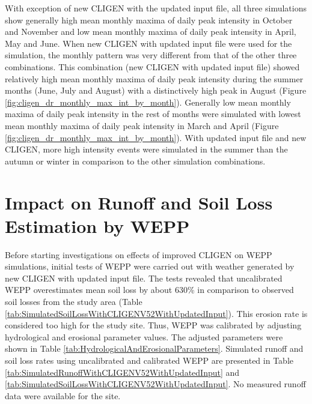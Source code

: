 With exception of new CLIGEN with the updated input file, all three simulations
show generally high mean monthly maxima of daily peak intensity in October and
November and low mean monthly maxima of daily peak intensity in April, May and
June. When new CLIGEN with updated input file were used for the simulation, the
monthly pattern was very different from that of the other three combinations.
This combination (new CLIGEN with updated input file) showed relatively high
mean monthly maxima of daily peak intensity during the summer months (June, July
and August) with a distinctively high peak in August (Figure
\ref{fig:cligen_dr_monthly_max_int_by_month}). Generally low mean monthly maxima
of daily peak intensity in the rest of months were simulated with lowest mean
monthly maxima of daily peak intensity in March and April (Figure
\ref{fig:cligen_dr_monthly_max_int_by_month}). With updated input file and new
CLIGEN, more high intensity events were simulated in the summer than the autumn
or winter in comparison to the other simulation combinations.

\section{Impact on Runoff and Soil Loss Estimation by WEPP}
\label{sec:RunoffAndSoilLossSimulation}
Before starting investigations on effects of improved CLIGEN on WEPP
simulations, initial tests of WEPP were carried out with weather generated by
new CLIGEN with updated input file. The tests revealed that uncalibrated WEPP
overestimates mean soil loss by about 630\% in comparison to observed soil
losses from the study area (Table
\ref{tab:SimulatedSoilLossWithCLIGENV52WithUpdatedInput}). This erosion rate is
considered too high for the study site. Thus, WEPP was calibrated by adjusting
hydrological and erosional parameter values. The adjusted parameters were shown
in Table \ref{tab:HydrologicalAndErosionalParameters}. Simulated runoff and soil
loss rates using uncalibrated and calibrated WEPP are presented in Table
\ref{tab:SimulatedRunoffWithCLIGENV52WithUpdatedInput} and
\ref{tab:SimulatedSoilLossWithCLIGENV52WithUpdatedInput}. No measured runoff
data were available for the site.

